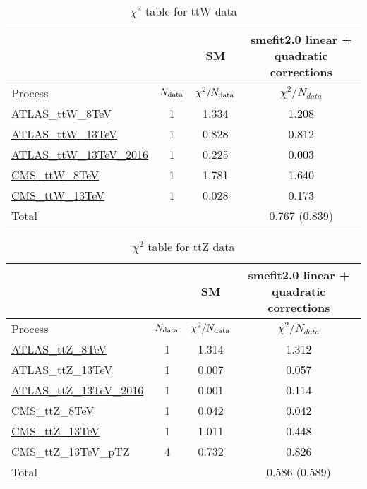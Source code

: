 \documentclass{article}
\begin{document}
\begin{table}[H]
\centering
\begin{tabular}{|l|c|c|c|}
\hline
 \multicolumn{2}{|c|}{} & SM& smefit2.0 linear + quadratic corrections\\ \hline
Process & $N_{\rm data}$ & $\chi^ 2/N_{\rm data}$& $\chi^ 2/N_{data}$\\ \hline
\href{https://arxiv.org/abs/1509.05276}{ATLAS_ttW_8TeV} & 1 & 1.334 & \textcolor{black}                            {1.208} \\ \hline
\href{https://arxiv.org/abs/1609.01599}{ATLAS_ttW_13TeV} & 1 & 0.828 & \textcolor{black}                            {0.812} \\ \hline
\href{https://arxiv.org/abs/1901.03584}{ATLAS_ttW_13TeV_2016} & 1 & 0.225 & \textcolor{black}                            {0.003} \\ \hline
\href{https://arxiv.org/abs/1510.01131}{CMS_ttW_8TeV} & 1 & 1.781 & \textcolor{black}                            {1.640} \\ \hline
\href{https://arxiv.org/abs/1711.02547}{CMS_ttW_13TeV} & 1 & 0.028 & \textcolor{black}                            {0.173} \\ \hline
\hline Total & &  & 0.767 (0.839) \\ \hline
\end{tabular}
\caption{$\chi^2$ table for ttW data}
\end{table}
\begin{table}[H]
\centering
\begin{tabular}{|l|c|c|c|}
\hline
 \multicolumn{2}{|c|}{} & SM& smefit2.0 linear + quadratic corrections\\ \hline
Process & $N_{\rm data}$ & $\chi^ 2/N_{\rm data}$& $\chi^ 2/N_{data}$\\ \hline
\href{https://arxiv.org/abs/1509.05276}{ATLAS_ttZ_8TeV} & 1 & 1.314 & \textcolor{black}                            {1.312} \\ \hline
\href{https://arxiv.org/abs/1609.01599}{ATLAS_ttZ_13TeV} & 1 & 0.007 & \textcolor{black}                            {0.057} \\ \hline
\href{https://arxiv.org/abs/1901.03584}{ATLAS_ttZ_13TeV_2016} & 1 & 0.001 & \textcolor{black}                            {0.114} \\ \hline
\href{https://arxiv.org/abs/1510.01131}{CMS_ttZ_8TeV} & 1 & 0.042 & \textcolor{black}                            {0.042} \\ \hline
\href{https://arxiv.org/abs/1711.02547}{CMS_ttZ_13TeV} & 1 & 1.011 & \textcolor{black}                            {0.448} \\ \hline
\href{https://arxiv.org/abs/1907.11270}{CMS_ttZ_13TeV_pTZ} & 4 & 0.732 & \textcolor{black}                            {0.826} \\ \hline
\hline Total & &  & 0.586 (0.589) \\ \hline
\end{tabular}
\caption{$\chi^2$ table for ttZ data}
\end{table}
\end{document}
